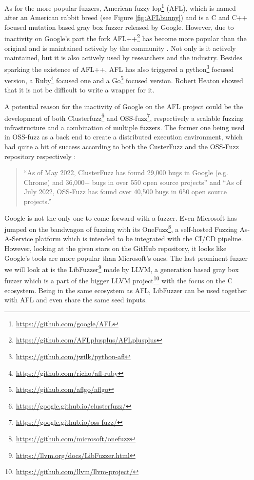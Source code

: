 As for the more popular fuzzers, American fuzzy lop\footnote{\url{https://github.com/google/AFL}} (AFL), which is named after an American rabbit breed (see Figure \ref{fig:AFLbunny}) and is a C and C++ focused mutation based gray box fuzzer released by Google. However, due to inactivity on Google’s part the fork AFL++\footnote{\url{https://github.com/AFLplusplus/AFLplusplus}} has become more popular than the original and is maintained actively by the community \cite{27AFL++}. Not only is it actively maintained, but it is also actively used by researchers and the industry. Besides sparking the existence of AFL++, AFL has also triggered a python\footnote{\url{https://github.com/jwilk/python-afl}} focused version, a Ruby\footnote{\url{https://github.com/richo/afl-ruby}} focused one and a Go\footnote{\url{https://github.com/aflgo/aflgo}} focused version. Robert Heaton \cite{AFLWrapper} showed that it is not be difficult to write a wrapper for it.

A potential reason for the inactivity of Google on the AFL project could be the development of both Clusterfuzz\footnote{\url{https://google.github.io/clusterfuzz/}} and OSS-fuzz\footnote{\url{https://google.github.io/oss-fuzz/}}, respectively a scalable fuzzing infrastructure and a combination of multiple fuzzers. The former one being used in OSS-fuzz as a back end to create a distributed execution environment, which had quite a bit of success according to both the CusterFuzz and the OSS-Fuzz repository respectively \cite{31OSS-FuzzBugs}:
\begin{quote} %
	“As of May 2022, ClusterFuzz has found 29,000 bugs in Google (e.g. Chrome) and 36,000+ bugs in over 550 open source projects” and \newline
	“As of July 2022, OSS-Fuzz has found over 40,500 bugs in 650 open source projects.”	
\end{quote}  

Google is not the only one to come forward with a fuzzer. Even Microsoft has jumped on the bandwagon of fuzzing with its OneFuzz\footnote{\url{https://github.com/microsoft/onefuzz}}, a self-hosted Fuzzing As-A-Service platform which is intended to be integrated with the CI/CD pipeline. However, looking at the given stars on the GitHub repository, it looks like Google’s tools are more popular than Microsoft’s ones. The last prominent fuzzer we will look at is the LibFuzzer\footnote{\url{https://llvm.org/docs/LibFuzzer.html}} made by LLVM, a generation based gray box fuzzer which is a part of the bigger LLVM project\footnote{\url{https://github.com/llvm/llvm-project/}} with the focus on the C ecosystem. Being in the same ecosystem as AFL, LibFuzzer can be used together with AFL and even share the same seed inputs.

